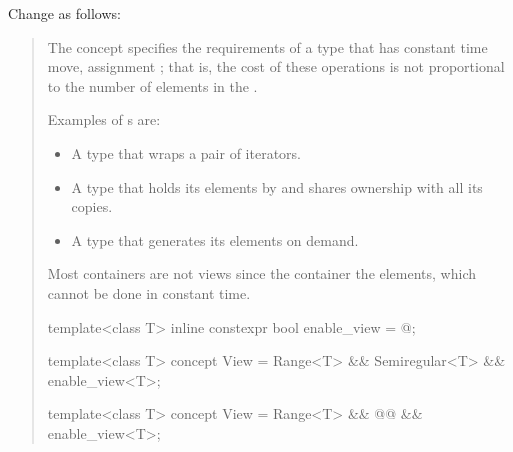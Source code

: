 Change  as follows:
\begin{quote}
\pnum
The  concept specifies the requirements of a  type
that has constant time  move,
 assignment ; that is,
the cost of these operations is not proportional to
the number of elements in the .

\pnum
\begin{example}
Examples of s are:

\begin{itemize}
\item A  type that wraps a pair of iterators.

\item A  type that holds its elements by 
and shares ownership with all its copies.

\item A  type that generates its elements on demand.
\end{itemize}

Most containers are not views since
 the container  the
elements, which cannot be done in constant time.
\end{example}

%
%
\begin{itemdecl}
template<class T>
  inline constexpr bool enable_view = @\seebelow@;

template<class T>
  concept View =
    Range<T> && Semiregular<T> && enable_view<T>;
\end{itemdecl}

\begin{codeblock}
template<class T>
  concept View =
    Range<T> && @@ && enable_view<T>;
\end{codeblock}
\end{quote}

